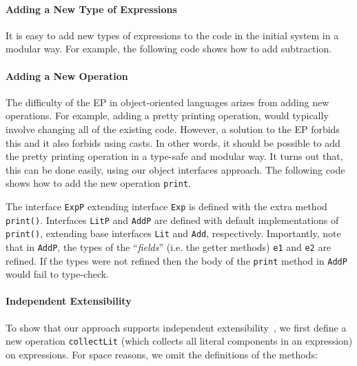 \paragraph{Adding a New Type of Expressions}
It is easy to add new types of expressions to the code in the initial system in a
modular way. For example, the following code shows how to add subtraction.



\paragraph{Adding a New Operation} The difficulty of the EP in object-oriented 
languages arizes from adding new operations. For example, adding a pretty printing 
operation, would typically involve changing all of the existing code. However, a solution 
to the EP forbids this and it also forbids using casts. In other words, it should be possible 
to add the pretty printing operation in a type-safe and modular way.  
It turns out that, this can be done easily, using our object interfaces approach. 
The following code shows how to add the new operation \texttt{print}.


\noindent  The interface \texttt{ExpP} extending interface \texttt{Exp} is defined with the
extra method \texttt{print()}. Interfaces \texttt{LitP} and \texttt{AddP} are
defined with default implementations of \texttt{print()}, extending
base interfaces \texttt{Lit} and \texttt{Add}, respectively. Importantly, note
that in \texttt{AddP}, the types of the ``\emph{fields}'' (i.e. the getter methods) \texttt{e1} 
and \texttt{e2} are refined. If the types were not refined then the body of the \texttt{print}
method in \texttt{AddP} would fail to type-check.

\paragraph{Independent Extensibility}
To show that our approach supports independent extensibility~\cite{zenger05independentlyextensible}, we first define a
new operation \texttt{collectLit} (which collects all
literal components in an expression) on expressions. For space reasons, 
we omit the definitions of the methods: 

